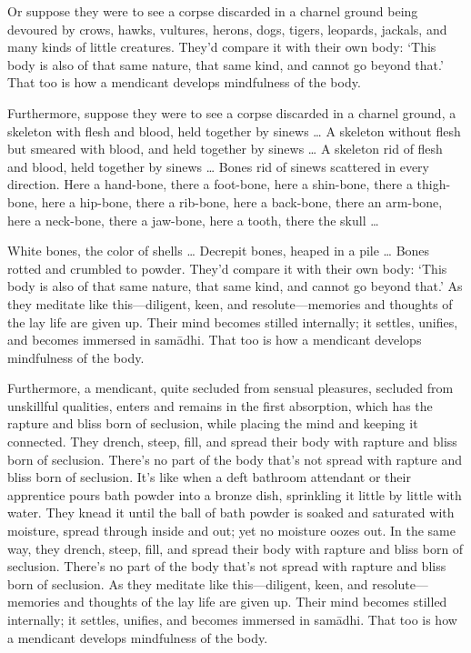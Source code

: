 \documentclass[12pt,openany]{book}%
\begin{document}
Or suppose they were to see a corpse discarded in a charnel ground being devoured by crows, hawks, vultures, herons, dogs, tigers, leopards, jackals, and many kinds of little creatures. They’d compare it with their own body: ‘This body is also of that same nature, that same kind, and cannot go beyond that.’ That too is how a mendicant develops mindfulness of the body. 

Furthermore, suppose they were to see a corpse discarded in a charnel ground, a skeleton with flesh and blood, held together by sinews … A skeleton without flesh but smeared with blood, and held together by sinews … A skeleton rid of flesh and blood, held together by sinews … Bones rid of sinews scattered in every direction. Here a hand-bone, there a foot-bone, here a shin-bone, there a thigh-bone, here a hip-bone, there a rib-bone, here a back-bone, there an arm-bone, here a neck-bone, there a jaw-bone, here a tooth, there the skull … 

White bones, the color of shells … Decrepit bones, heaped in a pile … Bones rotted and crumbled to powder. They’d compare it with their own body: ‘This body is also of that same nature, that same kind, and cannot go beyond that.’ As they meditate like this—diligent, keen, and resolute—memories and thoughts of the lay life are given up. Their mind becomes stilled internally; it settles, unifies, and becomes immersed in \textsanskrit{samādhi}. That too is how a mendicant develops mindfulness of the body. 

Furthermore, a mendicant, quite secluded from sensual pleasures, secluded from unskillful qualities, enters and remains in the first absorption, which has the rapture and bliss born of seclusion, while placing the mind and keeping it connected. They drench, steep, fill, and spread their body with rapture and bliss born of seclusion. There’s no part of the body that’s not spread with rapture and bliss born of seclusion. It’s like when a deft bathroom attendant or their apprentice pours bath powder into a bronze dish, sprinkling it little by little with water. They knead it until the ball of bath powder is soaked and saturated with moisture, spread through inside and out; yet no moisture oozes out. In the same way, they drench, steep, fill, and spread their body with rapture and bliss born of seclusion. There’s no part of the body that’s not spread with rapture and bliss born of seclusion. As they meditate like this—diligent, keen, and resolute—memories and thoughts of the lay life are given up. Their mind becomes stilled internally; it settles, unifies, and becomes immersed in \textsanskrit{samādhi}. That too is how a mendicant develops mindfulness of the body. 
\end{document}
